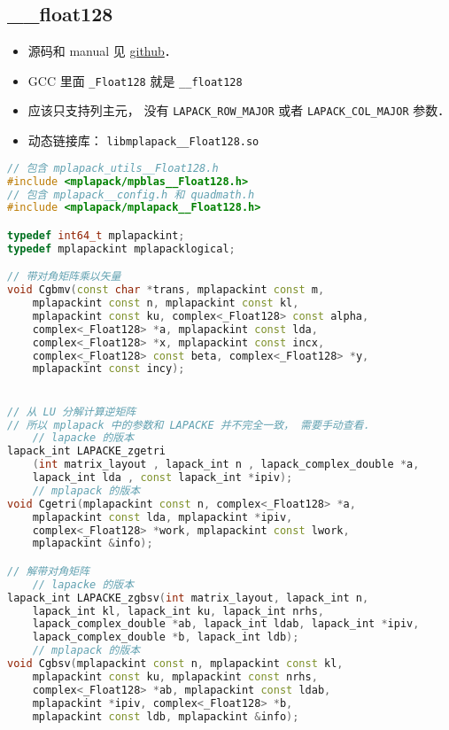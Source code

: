
\begin{issues}
\issueDraft
\end{issues}


\subsection{__float128}
\begin{itemize}
\item 源码和 manual 见 \href{https://github.com/nakatamaho/mplapack}{github}．
\item GCC 里面 \verb|_Float128| 就是 \verb|__float128|
\item 应该只支持列主元， 没有 \verb|LAPACK_ROW_MAJOR| 或者 \verb|LAPACK_COL_MAJOR| 参数．
\item 动态链接库： \verb|libmplapack__Float128.so|
\end{itemize}

\begin{lstlisting}[language=cpp]
// 包含 mplapack_utils__Float128.h
#include <mplapack/mpblas__Float128.h>
// 包含 mplapack__config.h 和 quadmath.h
#include <mplapack/mplapack__Float128.h>

typedef int64_t mplapackint;
typedef mplapackint mplapacklogical;

// 带对角矩阵乘以矢量
void Cgbmv(const char *trans, mplapackint const m,
    mplapackint const n, mplapackint const kl,
    mplapackint const ku, complex<_Float128> const alpha,
    complex<_Float128> *a, mplapackint const lda,
    complex<_Float128> *x, mplapackint const incx,
    complex<_Float128> const beta, complex<_Float128> *y,
    mplapackint const incy);


// 从 LU 分解计算逆矩阵
// 所以 mplapack 中的参数和 LAPACKE 并不完全一致， 需要手动查看．
    // lapacke 的版本
lapack_int LAPACKE_zgetri
    (int matrix_layout , lapack_int n , lapack_complex_double *a,
    lapack_int lda , const lapack_int *ipiv);
    // mplapack 的版本
void Cgetri(mplapackint const n, complex<_Float128> *a,
    mplapackint const lda, mplapackint *ipiv,
    complex<_Float128> *work, mplapackint const lwork,
    mplapackint &info);

// 解带对角矩阵
    // lapacke 的版本
lapack_int LAPACKE_zgbsv(int matrix_layout, lapack_int n,
    lapack_int kl, lapack_int ku, lapack_int nrhs,
    lapack_complex_double *ab, lapack_int ldab, lapack_int *ipiv,
    lapack_complex_double *b, lapack_int ldb);
    // mplapack 的版本
void Cgbsv(mplapackint const n, mplapackint const kl,
    mplapackint const ku, mplapackint const nrhs,
    complex<_Float128> *ab, mplapackint const ldab,
    mplapackint *ipiv, complex<_Float128> *b,
    mplapackint const ldb, mplapackint &info);
\end{lstlisting}
